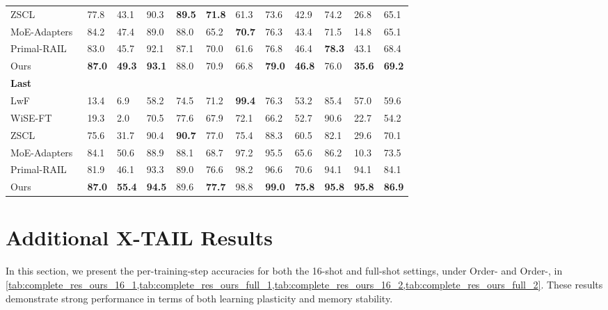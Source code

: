 \documentclass{article}
\theoremstyle{plain}
\theoremstyle{definition}
\theoremstyle{remark}
\begin{document}
\begin{table}[tbhp]
\begin{tabular}{b{15em}b{1.6em}b{1.6em}b{1.6em}b{1.6em}b{1.6em}b{1.6em}b{1.6em}b{1.6em}b{1.6em}b{1.6em}>{\centering\arraybackslash}m{3em}}
          \quad ZSCL~\cite{zheng2023preventing} & 77.8 & 43.1 & 90.3 & \textbf{89.5} & \textbf{71.8} & 61.3 & 73.6 & 42.9 & 74.2 & 26.8 & {\cellcolor{lightgrey}}65.1\\
          \quad MoE-Adapters~\cite{yu2024boosting} & 84.2 & 47.4 & 89.0 & 88.0 & 65.2 & \textbf{70.7 }& 76.3 & 43.4 & 71.5 & 14.8& {\cellcolor{lightgrey}}65.1\\
          \quad Primal-RAIL~\cite{xu2024advancing} & 83.0 & 45.7 & 92.1 & 87.1 & 70.0 & 61.6 & 76.8 & 46.4 & \textbf{78.3} & 43.1 & {\cellcolor{lightgrey}}68.4\\
          \quad Ours & \textbf{87.0} & \textbf{49.3} & \textbf{93.1} & 88.0 & 70.9 & 66.8 & \textbf{79.0} & \textbf{46.8} & 76.0 & \textbf{35.6} & {\cellcolor{lightgrey}}\textbf{69.2}\\
    \midrule
        \multicolumn{11}{l}{\textbf{Last}}\\ 
          \quad LwF~\cite{li2017learning} & 13.4 & 6.9 & 58.2 & 74.5 & 71.2 & \textbf{99.4} & 76.3 & 53.2 & 85.4 & 57.0 & {\cellcolor{lightgrey}}59.6\\
          \quad WiSE-FT~\cite{wortsman2022robust} & 19.3 & 2.0 & 70.5 & 77.6 & 67.9 & 72.1 & 66.2 & 52.7 & 90.6 & 22.7 & {\cellcolor{lightgrey}}54.2\\
          \quad ZSCL~\cite{zheng2023preventing} & 75.6 & 31.7 & 90.4 & \textbf{90.7} & 77.0 & 75.4 & 88.3 & 60.5 & 82.1 & 29.6 & {\cellcolor{lightgrey}}70.1\\
          \quad MoE-Adapters~\cite{yu2024boosting} & 84.1 & 50.6 & 88.9 & 88.1 & 68.7 & 97.2 & 95.5 & 65.6 & 86.2 & 10.3& {\cellcolor{lightgrey}}73.5\\
          \quad Primal-RAIL~\cite{xu2024advancing} & 81.9 & 46.1 & 93.3 & 89.0 & 76.6 & 98.2 & 96.6 & 70.6 & 94.1 & 94.1 & {\cellcolor{lightgrey}}84.1\\
          \quad Ours & \textbf{87.0} & \textbf{55.4} & \textbf{94.5} & 89.6 & \textbf{77.7} & 98.8 & \textbf{99.0} & \textbf{75.8} & \textbf{95.8} & \textbf{95.8} & {\cellcolor{lightgrey}}\textbf{86.9}\\
    \bottomrule
    \end{tabular}
\end{table}

\section{Additional X-TAIL Results}

In this section, we present the per-training-step accuracies for both the 16-shot and full-shot settings, under Order-\MakeUppercase{} and Order-\MakeUppercase{}, in \cref{tab:complete_res_ours_16_1,tab:complete_res_ours_full_1,tab:complete_res_ours_16_2,tab:complete_res_ours_full_2}. These results demonstrate strong performance in terms of both learning plasticity and memory stability.
\end{document}

